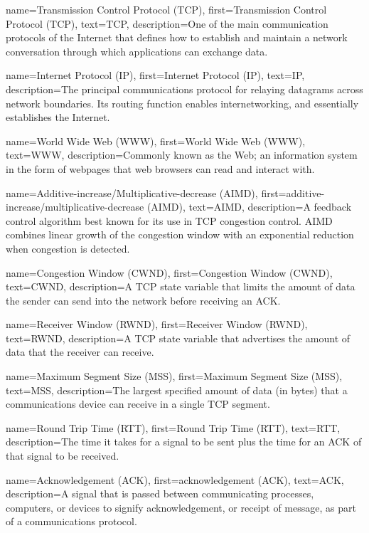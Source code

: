 {
    name={Transmission Control Protocol (TCP)},
    first={Transmission Control Protocol (TCP)},
    text={TCP},
    description={One of the main communication protocols of the Internet that defines how to establish and maintain a network conversation through which applications can exchange data.}
}

{
    name={Internet Protocol (IP)},
    first={Internet Protocol (IP)},
    text={IP},
    description={The principal communications protocol for relaying datagrams across network boundaries. Its routing function enables internetworking, and essentially establishes the Internet.}
}

{
    name={World Wide Web (WWW)},
    first={World Wide Web (WWW)},
    text={WWW},
    description={Commonly known as the Web; an information system in the form of webpages that web browsers can read and interact with.}
}

{
    name={Additive-increase/Multiplicative-decrease (AIMD)},
    first={additive-increase/multiplicative-decrease (AIMD)},
    text={AIMD},
    description={A feedback control algorithm best known for its use in TCP congestion control. AIMD combines linear growth of the congestion window with an exponential reduction when congestion is detected.}
}

{
    name={Congestion Window (CWND)},
    first={Congestion Window (CWND)},
    text={CWND},
    description={A TCP state variable that limits the amount of data the sender can send into the network before receiving an ACK.}
}

{
    name={Receiver Window (RWND)},
    first={Receiver Window (RWND)},
    text={RWND},
    description={A TCP state variable that advertises the amount of data that the receiver can receive.}
}

{
    name={Maximum Segment Size (MSS)},
    first={Maximum Segment Size (MSS)},
    text={MSS},
    description={The largest specified amount of data (in bytes) that a communications device can receive in a single TCP segment.}
}

{
    name={Round Trip Time (RTT)},
    first={Round Trip Time (RTT)},
    text={RTT},
    description={The time it takes for a signal to be sent plus the time for an ACK of that signal to be received.}
}

{
    name={Acknowledgement (ACK)},
    first={acknowledgement (ACK)},
    text={ACK},
    description={A signal that is passed between communicating processes, computers, or devices to signify acknowledgement, or receipt of message, as part of a communications protocol.}
}

